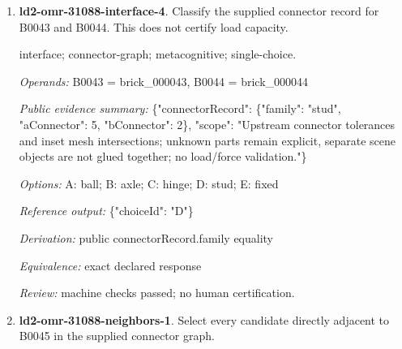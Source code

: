 \begin{enumerate}
\par{\small interface; connector-graph; metacognitive; single-choice.\par\textit{Operands:} B0180 = brick\_000180, B0184 = brick\_000184\par\textit{Public evidence summary:} \{"connectorRecord": \{"family": "hinge", "aConnector": 6, "bConnector": 2\}, "scope": "Upstream connector tolerances and inset mesh intersections; unknown parts remain explicit, separate scene objects are not glued together; no load/force validation."\}\par\textit{Options:} A: ball; B: axle; C: stud; D: hinge; E: fixed\par\textit{Reference output:} \{"choiceId": "D"\}\par\textit{Derivation:} public connectorRecord.family equality\par\textit{Equivalence:} exact declared response\par\textit{Review:} machine checks passed; no human certification.}
\item \textbf{ld2-omr-31088-interface-4}. Classify the supplied connector record for B0043 and B0044. This does not certify load capacity.
\par{\small interface; connector-graph; metacognitive; single-choice.\par\textit{Operands:} B0043 = brick\_000043, B0044 = brick\_000044\par\textit{Public evidence summary:} \{"connectorRecord": \{"family": "stud", "aConnector": 5, "bConnector": 2\}, "scope": "Upstream connector tolerances and inset mesh intersections; unknown parts remain explicit, separate scene objects are not glued together; no load/force validation."\}\par\textit{Options:} A: ball; B: axle; C: hinge; D: stud; E: fixed\par\textit{Reference output:} \{"choiceId": "D"\}\par\textit{Derivation:} public connectorRecord.family equality\par\textit{Equivalence:} exact declared response\par\textit{Review:} machine checks passed; no human certification.}
\item \textbf{ld2-omr-31088-neighbors-1}. Select every candidate directly adjacent to B0045 in the supplied connector graph.

\end{enumerate}
